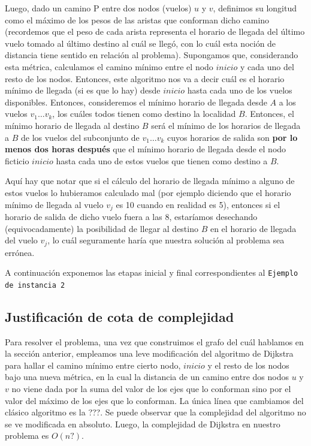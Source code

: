 \documentclass[11pt, a4paper, twoside]{article}
\begin{document}
\par Luego, dado un camino P entre dos nodos (vuelos) $u$ y $v$, definimos su longitud como
el máximo de los pesos de las aristas que conforman dicho camino (recordemos que el peso de cada
arista representa el horario de llegada del último vuelo tomado al último destino al cuál se
llegó, con lo cuál esta noción de distancia tiene sentido en relación al problema). 
Supongamos que, considerando 
esta métrica, calculamos el camino mínimo entre el nodo $inicio$ y cada uno del resto de los nodos.
Entonces, este algoritmo nos va a decir cuál es el horario mínimo de llegada (si es que lo hay) 
desde $inicio$ hasta cada uno de los vuelos disponibles. Entonces, consideremos el mínimo
horario de llegada desde $A$ a los vuelos $v_{1} \dots v_{k}$, los cuáles todos tienen como destino la 
localidad $B$. Entonces, el mínimo horario de llegada al destino $B$ será el mínimo de los horarios
de llegada a $B$ de los vuelos del subconjunto de $v_{1} \dots v_{k}$ cuyos horarios de salida son 
\textbf{por lo menos dos horas después} que el mínimo horario de llegada desde el nodo ficticio
$inicio$ hasta cada uno de estos vuelos que tienen como destino a $B$.

\par Aquí hay que notar que si el cálculo del horario de llegada mínimo a
alguno de estos vuelos lo hubieramos calculado mal (por ejemplo diciendo que el horario mínimo de
llegada al vuelo $v_{j}$ es 10 cuando en realidad es 5), entonces si el horario de salida de dicho vuelo
fuera a las 8, estaríamos desechando (equivocadamente) la posibilidad de llegar al destino $B$ en el 
horario de llegada del vuelo $v_{j}$, lo cuál seguramente haría que nuestra solución al problema
sea errónea.

\par A continuación exponemos las etapas inicial y final correspondientes al \texttt{Ejemplo de 
instancia 2} 


\subsection{Justificación de cota de complejidad}
Para resolver el problema, una vez que construimos el grafo del cuál hablamos en la sección anterior,
empleamos una leve modificación del algoritmo de Dijkstra para hallar el camino mínimo entre cierto
nodo, $inicio$ y el resto de los nodos bajo una nueva métrica, en la cual la distancia de un camino
entre dos nodos $u$ y $v$ no viene dada por la suma del valor de los ejes que lo conforman sino por
el valor del máximo de los ejes que lo conforman. La única línea que cambiamos del clásico algoritmo
es la ???. Se puede observar que la complejidad del algoritmo no se ve modificada en absoluto. Luego,
la complejidad de Dijkstra en nuestro problema es $O(n?)$.
\end{document}
